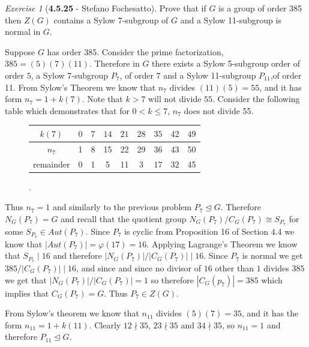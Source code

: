 \documentclass[12pt]{amsart}
\makeatletter
\theoremstyle{remark}
\newtheorem*{exercise}{Exercise}%
\renewenvironment{proof}[1][\proofname]{\par\doublespacing
  \pushQED{\qed}%
  \normalfont \topsep6\p@\@plus6\p@\relax
  \list{}{%
    \settowidth{\leftmargin}{\itshape\proofname:\hskip\labelsep}%
    \setlength{\labelwidth}{0pt}%
    \setlength{\itemindent}{-\leftmargin}%
  }%
  \item[\hskip\labelsep\itshape#1\@addpunct{:}]\ignorespaces
}{%
  \popQED\endlist\@endpefalse
  \singlespacing
}
\theoremstyle{mycomment}
\makeatother
\begin{document}
\begin{exercise}[\textbf{4.5.25} - Stefano Fochesatto] Prove that if $G$ is a group of order 385 then $Z(G)$ contains a Sylow 7-subgroup 
  of $G$ and a Sylow 11-subgroup is normal in $G$. 
   \begin{proof}Suppose $G$ has order 385. Consider the prime factorization, $385 = (5)(7)(11)$.
    Therefore in $G$ there exists a Sylow 5-subgroup order of order $5$, a Sylow 7-subgroup $P_7$, of order $7$
    and a Sylow 11-subgroup $P_{11}$,of order 11. From Sylow's Theorem we know that $n_{7}$ divides $(11)(5) = 55$, and it 
    has form $n_{7} = 1 + k(7)$. Note that $k > 7$ will not divide $55$. Consider the following table which demonstrates that 
    for $0<k\leq7$, $n_7$ does not divide 55.  
    \begin{figure}[H]
      \begin{tabular}{ c || c | c | c | c | c | c | c | c} 
        $k(7)$ & $0$ &$7$ &$14$& $21$& $28$& $35$& $42$& $49$\\
        \hline
        $n_{7}$ & 1& 8& 15& 22& 29& 36& 43& 50\\
        \hline
        remainder & 0 & 1& 5& 11 & 3 & 17 & 32& 45 
      \end{tabular}.
    \end{figure}
    Thus $n_{7} = 1$ and similarly to the previous problem $P_7 \trianglelefteq G$. Therefore $N_G(P_7) = G$ and recall that 
    the quotient group $N_G(P_7)/C_G(P_7) \cong S_{P_7}$ for some $S_{P_7} \in Aut(P_7)$. Since $P_7$ is cyclic from Proposition 16 of 
    Section 4.4 we know that $|Aut(P_7)| = \varphi(17) = 16$. Applying Lagrange's Theorem we know that  $S_{P_7} \mid 16$ and therefore 
    $|N_G(P_7)|/|C_G(P_7)| \mid 16$. Since $P_7$ is normal we get  $385/|C_G(P_7)| \mid 16$, and since and since no divisor of $16$ other than $1$ divides $385$
    we get that $|N_G(P_7)|/|C_G(P_7)| = 1$ so therefore $|C_G(p_7)| = 385$ which implies that $C_G(P_7) = G$. Thus $P_7 \in Z(G)$.


    From Sylow's theorem we know that $n_{11}$ divides $(5)(7) = 35$, and it has the form $n_{11} = 1 + k(11)$. Clearly $12 \nmid 35$, 
    $23 \nmid 35$ and $34 \nmid 35$, so $n_{11} = 1$ and therefore $P_{11} \trianglelefteq G$. 
    \end{proof}
\end{exercise}
\vspace{.15in}
\end{document}
